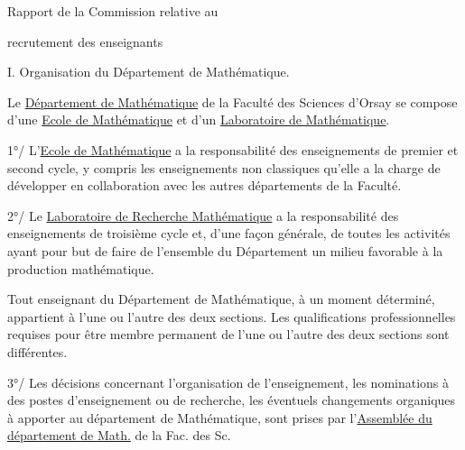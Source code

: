 
\begin{center}
Rapport de la Commission relative au

recrutement des enseignants
\end{center}

I. Organisation du Département de Mathématique.

Le \uline{Département de Mathématique} de la Faculté des Sciences d'Orsay se compose d'une \uline{Ecole de Mathématique} et d'un \uline{Laboratoire de Mathématique}.

1°/ L'\uline{Ecole de Mathématique} a la responsabilité des enseignements de premier et second cycle, y compris les enseignements non classiques qu'elle a la charge de développer en collaboration avec les autres départements de la Faculté.

2°/ Le \uline{Laboratoire de Recherche Mathématique} a la responsabilité des enseignements de troisième cycle et, d'une façon générale, de toutes les activités ayant pour but de faire de l'ensemble du Département un milieu favorable à la production mathématique.

Tout enseignant du Département de Mathématique, à un moment déterminé, appartient à l'une ou l'autre des deux sections. Les qualifications professionnelles requises pour être membre permanent de l'une ou l'autre des deux sections sont différentes.

3°/ Les décisions concernant l'organisation de l'enseignement, les nominations à des postes d'enseignement ou de recherche, les éventuels changements organiques à apporter au département de Mathématique, sont prises par l'\uline{Assemblée du département de Math.} de la Fac. des Sc.

